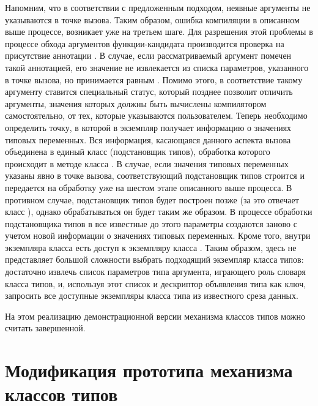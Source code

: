 Напомним, что в соответствии с предложенным подходом, неявные аргументы не указываются в точке вызова. Таким образом, ошибка компиляции в описанном выше процессе, возникает уже на третьем шаге. Для разрешения этой проблемы в процессе обхода аргументов функции-кандидата производится проверка на присутствие аннотации . В случае, если рассматриваемый аргумент помечен такой аннотацией, его значение не извлекается из списка параметров, указанного в точке вызова, но принимается равным . Помимо этого, в соответствие такому аргументу ставится специальный статус, который позднее позволит отличить аргументы, значения которых должны быть вычислены компилятором самостоятельно, от тех, которые указываются пользователем. Теперь необходимо определить точку, в которой в экземпляр  получает информацию о значениях типовых переменных. Вся информация, касающаяся данного аспекта вызова объединена в единый класс  (подстановщик типов), обработка которого происходит в методе  класса . В случае, если значения типовых переменных указаны явно в точке вызова, соответствующий подстановщик типов строится и передается на обработку уже на шестом этапе описанного выше процесса. В противном случае, подстановщик типов будет построен позже (за это отвечает класс ), однако обрабатываться он будет таким же образом. В процессе обработки подстановщика типов в  все известные до этого параметры создаются заново с учетом новой информации о значениях типовых переменных. Кроме того, внутри экземпляра класса  есть доступ к экземпляру класса . Таким образом, здесь не представляет большой сложности выбрать подходящий экземпляр класса типов: достаточно извлечь список параметров типа аргумента, играющего роль словаря класса типов, и, используя этот список и дескриптор объявления типа как ключ, запросить все доступные экземпляры класса типа из известного среза данных.    

На этом реализацию демонстрационной версии механизма классов типов можно считать завершенной. 

\section{Модификация прототипа механизма классов типов}

